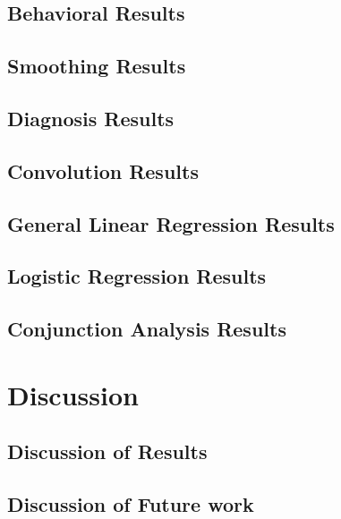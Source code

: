 \documentclass[11pt]{article}
\begin{document}
    \subsection{Behavioral Results}
            
    \subsection{Smoothing Results}
            
    \subsection{Diagnosis Results}
            
    \subsection{Convolution Results}
            
    \subsection{General Linear Regression Results}
            
    \subsection{Logistic Regression Results}
            
    \subsection{Conjunction Analysis Results}
            

\section{Discussion}

    \subsection{Discussion of Results}
            
    \subsection{Discussion of Future work}
            


\end{document}
